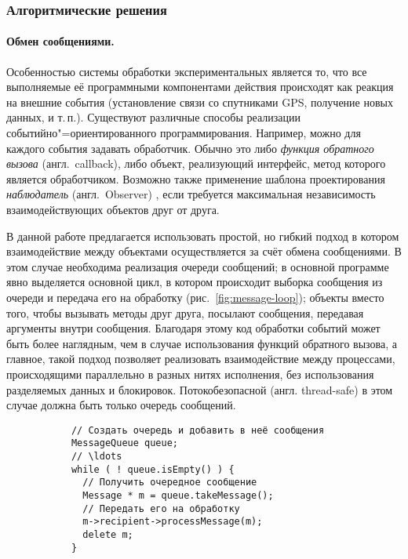 \documentclass[a4paper, 14pt, titlepage]{extarticle}
\newcommand{\eng}[1]{\foreignlanguage{english}{#1}}
\newcommand{\term}[1]{\emph{#1}}
\newenvironment{myfigure}[2]%
    {\pushQED{\caption{#1} \label{#2}} %
     \begin{figure}[!htb]\centering } %
    {  \popQED %
     \end{figure}}
\begin{document}
  \subsubsection{Алгоритмические решения}
  \paragraph{Обмен сообщениями.}
  Особенностью системы обработки экспериментальных является то, что все выполняемые её программными
  компонентами действия происходят как реакция на внешние события (установление связи со
  спутниками GPS, получение новых данных, и т.\,п.). Существуют различные способы реализации
  событийно"=ориентированного программирования. Например, можно для каждого события задавать
  обработчик. Обычно это либо \term{функция обратного вызова} (англ.~\eng{callback}), либо объект,
  реализующий интерфейс, метод которого является обработчиком. Возможно также применение шаблона
  проектирования \term{наблюдатель} (англ.~\eng{Observer}) \cite{gamma-patterns}, если требуется
  максимальная независимость взаимодействующих объектов друг от друга.

  В данной работе предлагается использовать простой, но гибкий подход в котором взаимодействие между
  объектами осуществляется за счёт обмена сообщениями. В этом случае необходима реализация очереди
  сообщений; в основной программе явно выделяется основной цикл, в котором происходит выборка
  сообщения из очереди и передача его на обработку (рис.~\ref{fig:message-loop}); объекты вместо
  того, чтобы вызывать методы друг друга, посылают сообщения, передавая аргументы внутри сообщения.
  Благодаря этому код обработки событий может быть более наглядным, чем в случае использования
  функций обратного вызова, а главное, такой подход позволяет реализовать взаимодействие между
  процессами, происходящими параллельно в разных нитях исполнения, без использования разделяемых
  данных и блокировок. Потокобезопасной (англ. \eng{thread-safe}) в этом случае должна быть только
  очередь сообщений.

  \begin{myfigure}{Примерный вид основного цикла}{fig:message-loop}
    \begin{lstlisting}
      // Создать очередь и добавить в неё сообщения
      MessageQueue queue;
      // \ldots
      while ( ! queue.isEmpty() ) {
        // Получить очередное сообщение
        Message * m = queue.takeMessage();
        // Передать его на обработку
        m->recipient->processMessage(m);
        delete m;
      }
    \end{lstlisting}
  \end{myfigure}
\end{document}
